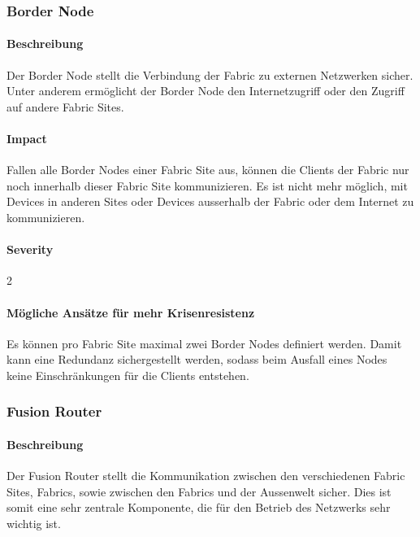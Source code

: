 \subsubsection{Border Node}

\paragraph{Beschreibung}

Der Border Node stellt die Verbindung der Fabric zu externen Netzwerken sicher. Unter anderem ermöglicht der Border Node den Internetzugriff oder den Zugriff auf andere Fabric Sites.

\paragraph{Impact}

Fallen alle Border Nodes einer Fabric Site aus, können die Clients der Fabric nur noch innerhalb dieser Fabric Site kommunizieren. Es ist nicht mehr möglich, mit Devices in anderen Sites oder Devices ausserhalb der Fabric oder dem Internet zu kommunizieren.

\paragraph{Severity} 2

\paragraph{Mögliche Ansätze für mehr Krisenresistenz}

Es können pro Fabric Site maximal zwei Border Nodes definiert werden. Damit kann eine Redundanz sichergestellt werden, sodass beim Ausfall eines Nodes keine Einschränkungen für die Clients entstehen. 

\subsubsection{Fusion Router}

\paragraph{Beschreibung}

Der Fusion Router stellt die Kommunikation zwischen den verschiedenen Fabric Sites, Fabrics, sowie zwischen den Fabrics und der Aussenwelt sicher. Dies ist somit eine sehr zentrale Komponente, die für den Betrieb des Netzwerks sehr wichtig ist.

